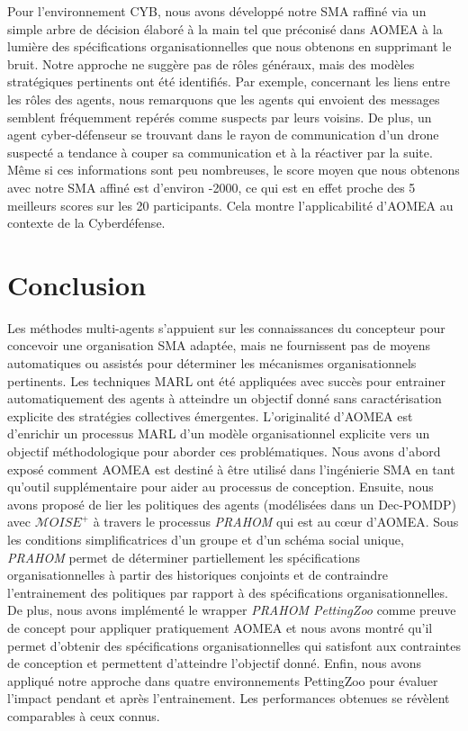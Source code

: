 \documentclass[contribution]{jfsma}
\begin{document}
Pour l'environnement CYB, nous avons développé notre SMA raffiné via un simple arbre de décision élaboré à la main tel que préconisé dans AOMEA à la lumière des spécifications organisationnelles que nous obtenons en supprimant le bruit. Notre approche ne suggère pas de rôles généraux, mais des modèles stratégiques pertinents ont été identifiés. Par exemple, concernant les liens entre les rôles des agents, nous remarquons que les agents qui envoient des messages semblent fréquemment repérés comme suspects par leurs voisins. De plus, un agent cyber-défenseur se trouvant dans le rayon de communication d’un drone suspecté a tendance à couper sa communication et à la réactiver par la suite. Même si ces informations sont peu nombreuses, le score moyen que nous obtenons avec notre SMA affiné est d'environ -2000, ce qui est en effet proche des 5 meilleurs scores sur les 20 participants. Cela montre l'applicabilité d'AOMEA au contexte de la Cyberdéfense.

\section{Conclusion}

Les méthodes multi-agents s'appuient sur les connaissances du concepteur pour concevoir une organisation SMA adaptée, mais ne fournissent pas de moyens automatiques ou assistés pour déterminer les mécanismes organisationnels pertinents.
Les techniques MARL ont été appliquées avec succès pour entrainer automatiquement des agents à atteindre un objectif donné sans caractérisation explicite des stratégies collectives émergentes.
L'originalité d'AOMEA est d'enrichir un processus MARL d'un modèle organisationnel explicite vers un objectif méthodologique pour aborder ces problématiques. Nous avons d'abord exposé comment AOMEA est destiné à être utilisé dans l'ingénierie SMA en tant qu'outil supplémentaire pour aider au processus de conception.
Ensuite, nous avons proposé de lier les politiques des agents (modélisées dans un Dec-POMDP) avec $\mathcal{M}OISE^+$ à travers le processus \emph{PRAHOM} qui est au cœur d'AOMEA. Sous les conditions simplificatrices d'un groupe et d'un schéma social unique, \emph{PRAHOM} permet de déterminer partiellement les spécifications organisationnelles à partir des historiques conjoints et de contraindre l'entrainement des politiques par rapport à des spécifications organisationnelles.
De plus, nous avons implémenté le wrapper \emph{PRAHOM PettingZoo} comme preuve de concept pour appliquer pratiquement AOMEA et nous avons montré qu'il permet d'obtenir des spécifications organisationnelles qui satisfont aux contraintes de conception et permettent d'atteindre l'objectif donné.
Enfin, nous avons appliqué notre approche dans quatre environnements PettingZoo pour évaluer l'impact pendant et après l'entrainement. Les performances obtenues se révèlent comparables à ceux connus.
\end{document}
